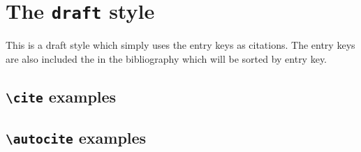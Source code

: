 \documentclass[a4paper]{article}
\newcommand{\cmd}[1]{\texttt{\textbackslash #1}}
\begin{document}
\section*{The \texttt{draft} style}

This is a draft style which simply uses the entry keys as citations.
The entry keys are also included the in the bibliography which will
be sorted by entry key.

\subsection*{\cmd{cite} examples}

\cite{bertram,companion,gillies,aristotle:anima}

\subsection*{\cmd{autocite} examples}

\autocite{baez/article,hammond,reese,spiegelberg}

\printbibliography
\end{document}
